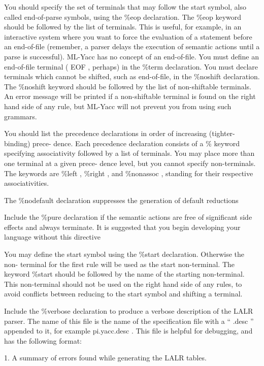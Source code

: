 \documentclass[8pt, a4paper, oneside, twocolumn]{extarticle}
\begin{document}
You  should  specify the  set  of terminals  that  may  follow  the  start symbol,  also  called
end-of-parse symbols, using the
\%eop
declaration.  The
\%eop
keyword should be followed
by the list of terminals.  This is useful, for example, in an interactive system where you
want to force the evaluation of a statement before an end-of-file (remember,  a parser
delays the execution of semantic actions until a parse is successful).
ML-Yacc has no concept of an end-of-file.  You must define an end-of-file terminal
(
EOF
, perhaps) in the
\%term
declaration.  You must declare terminals which cannot be
shifted, such as end-of-file, in the
\%noshift
declaration.  The
\%noshift
keyword should
be followed by the list of non-shiftable terminals.  An error message will be printed if a
non-shiftable terminal is found on the right hand side of any rule, but ML-Yacc will not
prevent you from using such grammars.


You should list the precedence declarations in order of increasing (tighter-binding) prece-
dence.   Each  precedence  declaration  consists  of  a
\%
keyword  specifying  associativity
followed by a list of terminals.  You may place more than one terminal at a given prece-
dence level,  but you cannot specify non-terminals.  The keywords are
\%left
,
\%right
,
and
\%nonassoc
, standing for their respective associativities.

The
\%nodefault
declaration  suppresses  the  generation  of  default  reductions

Include the
\%pure
declaration if the semantic actions are free of significant side effects
and always terminate.  It is suggested that you begin developing your language without
this directive

You  may  define  the  start  symbol  using  the
\%start
declaration.   Otherwise  the  non-
terminal for the first rule will be used as the start non-terminal.
The keyword
\%start
should be followed by the name of the starting non-terminal.  This non-terminal should
not be used on the right hand side of any rules, to avoid conflicts between reducing to
the start symbol and shifting a terminal.

Include the
\%verbose
declaration to produce a verbose description of the LALR parser.
The name of this file is the name of the specification file with a “
.desc
” appended to it,
for example
pi.yacc.desc
.
This file is helpful for debugging, and has the following format:

1.  A summary of errors found while generating the LALR tables.
\end{document}
